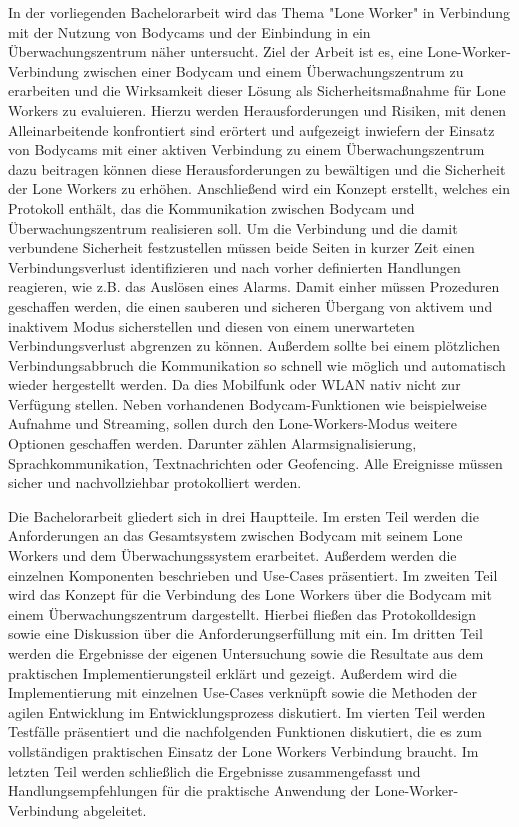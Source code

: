 \documentclass[thesis.tex]{subfiles}
\begin{document}
In der vorliegenden Bachelorarbeit wird das Thema "Lone Worker" in Verbindung mit der Nutzung von Bodycams und der Einbindung in ein Überwachungszentrum näher untersucht.
Ziel der Arbeit ist es, eine Lone-Worker-Verbindung zwischen einer Bodycam und einem Überwachungszentrum zu erarbeiten und die Wirksamkeit dieser Lösung als Sicherheitsmaßnahme für Lone Workers zu evaluieren.
Hierzu werden Herausforderungen und Risiken, mit denen Alleinarbeitende konfrontiert sind erörtert und aufgezeigt inwiefern der Einsatz von Bodycams mit einer aktiven Verbindung zu einem Überwachungszentrum dazu beitragen können diese Herausforderungen zu bewältigen und die Sicherheit der Lone Workers zu erhöhen.
Anschließend wird ein Konzept erstellt, welches ein Protokoll enthält, das die Kommunikation zwischen Bodycam und Überwachungszentrum realisieren soll.
Um die Verbindung und die damit verbundene Sicherheit festzustellen müssen beide Seiten in kurzer Zeit einen Verbindungsverlust identifizieren und nach vorher definierten Handlungen reagieren, wie z.B. das Auslösen eines Alarms.
Damit einher müssen Prozeduren geschaffen werden, die einen sauberen und sicheren Übergang von aktivem und inaktivem Modus sicherstellen und diesen von einem unerwarteten Verbindungsverlust abgrenzen zu können.
Außerdem sollte bei einem plötzlichen Verbindungsabbruch die Kommunikation so schnell wie möglich und automatisch wieder hergestellt werden.
Da dies Mobilfunk oder WLAN nativ nicht zur Verfügung stellen.
Neben vorhandenen Bodycam-Funktionen wie beispielweise Aufnahme und Streaming, sollen durch den Lone-Workers-Modus weitere Optionen geschaffen werden.
Darunter zählen Alarmsignalisierung, Sprachkommunikation, Textnachrichten oder Geofencing. Alle Ereignisse müssen sicher und nachvollziehbar protokolliert werden.

Die Bachelorarbeit gliedert sich in drei Hauptteile. Im ersten Teil werden die Anforderungen an das Gesamtsystem zwischen Bodycam mit seinem Lone Workers und dem Überwachungssystem erarbeitet. Außerdem werden die einzelnen Komponenten beschrieben und Use-Cases präsentiert. Im zweiten Teil wird das Konzept für die Verbindung des Lone Workers über die Bodycam mit einem Überwachungszentrum dargestellt. Hierbei fließen das Protokolldesign sowie eine Diskussion über die Anforderungserfüllung mit ein. Im dritten Teil werden die Ergebnisse der eigenen Untersuchung sowie die Resultate aus dem praktischen Implementierungsteil erklärt und gezeigt. Außerdem wird die Implementierung mit einzelnen Use-Cases verknüpft sowie die Methoden der agilen Entwicklung im Entwicklungsprozess diskutiert. Im vierten Teil werden Testfälle präsentiert und die nachfolgenden Funktionen diskutiert, die es zum vollständigen praktischen Einsatz der Lone Workers Verbindung braucht. Im letzten Teil werden schließlich die Ergebnisse zusammengefasst und Handlungsempfehlungen für die praktische Anwendung der Lone-Worker-Verbindung abgeleitet.
\end{document}
